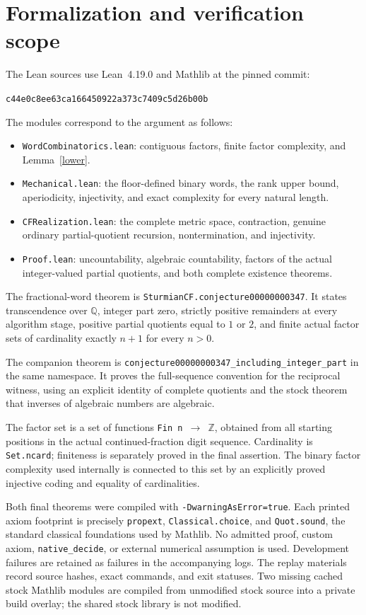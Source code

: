 \documentclass[11pt]{article}
\newcommand{\Q}{\mathbb Q}
\begin{document}
\section{Formalization and verification scope}
The Lean sources use Lean~4.19.0 and Mathlib at the pinned commit:
\begin{center}
\texttt{c44e0c8ee63ca166450922a373c7409c5d26b00b}
\end{center}
The modules correspond to the argument as follows:
\begin{itemize}
\item \texttt{WordCombinatorics.lean}: contiguous factors, finite factor complexity, and Lemma~\ref{lower}.
\item \texttt{Mechanical.lean}: the floor-defined binary words, the rank upper bound, aperiodicity, injectivity, and exact complexity for every natural length.
\item \texttt{CFRealization.lean}: the complete metric space, contraction, genuine ordinary partial-quotient recursion, nontermination, and injectivity.
\item \texttt{Proof.lean}: uncountability, algebraic countability, factors of the actual integer-valued partial quotients, and both complete existence theorems.
\end{itemize}
The fractional-word theorem is \texttt{SturmianCF.conjecture00000000347}. It states transcendence over $\Q$, integer part zero, strictly positive remainders at every algorithm stage, positive partial quotients equal to $1$ or $2$, and finite actual factor sets of cardinality exactly $n+1$ for every $n>0$.

The companion theorem is \texttt{conjecture00000000347\_including\_integer\_part} in the same namespace. It proves the full-sequence convention for the reciprocal witness, using an explicit identity of complete quotients and the stock theorem that inverses of algebraic numbers are algebraic.

The factor set is a set of functions \texttt{Fin n $\to$ $\mathbb Z$}, obtained from all starting positions in the actual continued-fraction digit sequence. Cardinality is \texttt{Set.ncard}; finiteness is separately proved in the final assertion. The binary factor complexity used internally is connected to this set by an explicitly proved injective coding and equality of cardinalities.

Both final theorems were compiled with \texttt{-DwarningAsError=true}. Each printed axiom footprint is precisely \texttt{propext}, \texttt{Classical.choice}, and \texttt{Quot.sound}, the standard classical foundations used by Mathlib. No admitted proof, custom axiom, \texttt{native\_decide}, or external numerical assumption is used. Development failures are retained as failures in the accompanying logs. The replay materials record source hashes, exact commands, and exit statuses. Two missing cached stock Mathlib modules are compiled from unmodified stock source into a private build overlay; the shared stock library is not modified.
\end{document}
